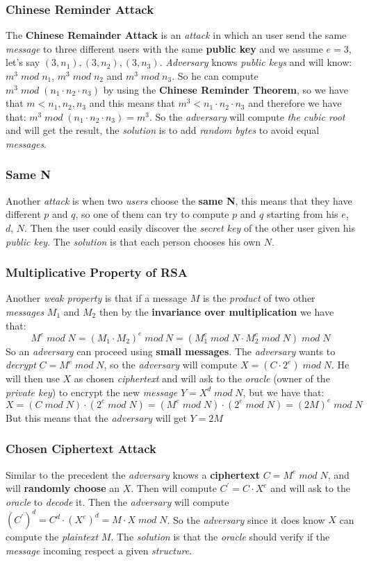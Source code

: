 \documentclass{article}
\begin{document}
\subsubsection{Chinese Reminder Attack}
The \textbf{Chinese Remainder Attack} is an \emph{attack} in which an user send the same \emph{message} to three different users with the same \textbf{public key} and we assume $e=3$, let's say $(3,n_1),(3,n_2),(3,n_3)$. \emph{Adversary} knows \emph{public keys} and will know: $m^3 \; mod \; n_1$,  $m^3 \; mod \; n_2$ and  $m^3 \; mod \; n_3$. So he can compute $m^3\; mod\; (n_1 \cdot n_2 \cdot n_3)$ by using the \textbf{Chinese Reminder Theorem}, so we have that $m<n_1, n_2, n_3$ and this means that $m^3 < n_1 \cdot n_2 \cdot n_3$ and therefore we have that:  $m^3 \; mod \; (n_1 \cdot n_2 \cdot n_3) = m^3$. So the \emph{adversary} will compute \emph{the cubic root} and will get the result, the \emph{solution} is to add \emph{random bytes} to avoid equal \emph{messages}. 
\subsubsection{Same N}
Another \emph{attack} is when two \emph{users} choose the \textbf{same N}, this means that they have different $p$ and $q$, so one of them can try to compute $p$ and $q$ starting from his $e$, $d$, $N$. Then the user could easily discover the \emph{secret key} of the other user given his \emph{public key}. The \emph{solution} is that each person chooses his own $N$.   
\subsubsection{Multiplicative Property of RSA}
Another \emph{weak property} is that if a message $M$ is the \emph{product} of two other \emph{messages} $M_1$ and $M_2$ then by the \textbf{invariance over multiplication} we have that: 
\[ M^e\; mod\; N = (M_1 \cdot M_2)^e\; mod\: N = (M_1^e\; mod\; N \cdot M_2^e\; mod\; N)\; mod\; N\]
So an \emph{adversary} can proceed using \textbf{small messages}. The \emph{adversary} wants to \emph{decrypt} $C=M^e\; mod\; N$, so the \emph{adversary} will compute $X = (C \cdot 2^e)\; mod\; N$. He will then use $X$ as chosen \emph{ciphertext} and will ask to the \emph{oracle} (owner of the \emph{private key}) to encrypt the new \emph{message} $Y=X^d\; mod\; N$, but we have that: 
\[ X = (C\; mod\; N)\cdot(2^e \; mod\;  N) = (M^e \; mod\;  N) \cdot (2^e \; mod\; N) = (2M)^e \; mod\; N\]
But this means that the \emph{adversary} will get $Y= 2M$ 
\subsubsection{Chosen Ciphertext Attack}
Similar to the precedent the \emph{adversary} knows a \textbf{ciphertext} $C= M^e \; mod\; N$, and will \textbf{randomly choose} an $X$. Then will compute $C^{'} = C \cdot X^e$ and will ask to the \emph{oracle} to \emph{decode} it. Then the \emph{adversary} will compute $(C^{'})^d = C^d \cdot (X^e)^d = M \cdot X \; mod\; N$. So the \emph{adversary} since it does know $X$ can compute the \emph{plaintext} $M$. The \emph{solution} is that the \emph{oracle} should verify if the \emph{message} incoming respect a given \emph{structure}.
\end{document}
